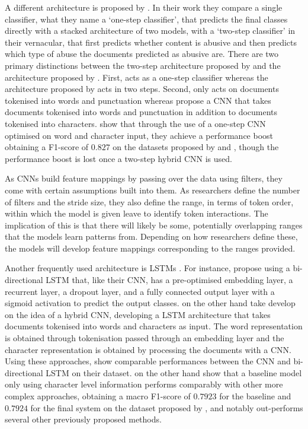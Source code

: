 A different architecture is proposed by \citet{Park:2017}.  
In their work they compare a single classifier, what they name a `one-step classifier', that predicts the final classes directly with a stacked architecture of two models, with a `two-step classifier' in their vernacular, that first predicts whether content is abusive and then predicts which type of abuse the documents predicted as abusive are.  
There are two primary distinctions between the two-step architecture proposed by \citet{Park:2017} and the architecture proposed by \citet{Kolhatkar:2020}.  
First, \citet{Kolhatkar:2020} acts as a one-step classifier whereas the architecture proposed by \citet{Park:2017} acts in two steps.  
Second, \citet{Kolhatkar:2020} only acts on documents tokenised into words and punctuation whereas \citet{Park:2017} propose a CNN that takes documents tokenised into words and punctuation in addition to documents tokenised into characters.  
\citet{Park:2017} show that through the use of a one-step CNN optimised on word and character input, they achieve a performance boost obtaining a F1-score of $0.827$ on the datasets proposed by \citet{Waseem-Hovy:2016} and \citet{Waseem:2016}, though the performance boost is lost once a two-step hybrid CNN is used.  
  
As CNNs build feature mappings by passing over the data using filters, they come with certain assumptions built into them.  
As researchers define the number of filters and the stride size, they also define the range, in terms of token order, within which the model is given leave to identify token interactions.  
The implication of this is that there will likely be some, potentially overlapping ranges that the models learn patterns from.  
Depending on how researchers define these, the models will develop feature mappings corresponding to the ranges provided.  
  
Another frequently used architecture is LSTMs \citep{Badjatiya:2017,Kolhatkar:2020,Meyer:2019}.  
For instance, \citet{Kolhatkar:2020} propose using a bi-directional LSTM that, like their CNN, has a pre-optimised embedding layer, a recurrent layer, a dropout layer, and a fully connected output layer with a sigmoid activation to predict the output classes.  
\citet{Meyer:2019} on the other hand take develop on the idea of a hybrid CNN, developing a LSTM architecture that takes documents tokenised into words and characters as input.  
The word representation is obtained through tokenisation passed through an embedding layer and the character representation is obtained by processing the documents with a CNN.  
Using these approaches, \citet{Kolhatkar:2020} show comparable performances between the CNN and bi-directional LSTM on their dataset.  
\citet{Meyer:2019} on the other hand show that a baseline model only using character level information performs comparably with other more complex approaches, obtaining a macro F1-score of $0.7923$ for the baseline and $0.7924$ for the final system on the dataset proposed by \citet{Waseem-Hovy:2016}, and notably out-performs several other previously proposed methods.  
  
